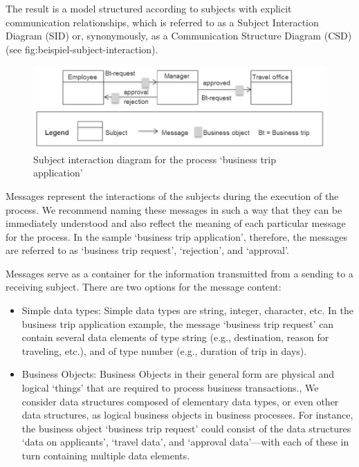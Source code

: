 The result is a model structured according to subjects with explicit communication relationships, which is referred to as a Subject Interaction Diagram (SID) or, synonymously, as a Communication Structure Diagram (CSD) (see \figurename{fig:beispiel-subject-interaction}).

\begin{figure}[ph]
	\centering
	\includegraphics[width=14cm]{20181026-Ontologie-Bilder/Grafiken-Ontologie/SUbject-Interaction/Beispiel-Subject-Interaction}
	\caption[Subject interaction diagram]{Subject interaction diagram for the process ‘business trip application’}
	\label{fig:beispiel-subject-interaction}
\end{figure}


Messages represent the interactions of the subjects during the execution of the process. We recommend naming these messages in such a way that they can be immediately understood and also reflect the meaning of each particular message for the process. In the sample ‘business trip application’, therefore, the messages are referred to as ‘business trip request’, ‘rejection’, and ‘approval’.

Messages serve as a container for the information transmitted from a sending to a receiving subject. There are two options for the message content:

\begin{itemize}
	\item 	Simple data types: Simple data types are string, integer, character, etc. In the business trip application example, the message ‘business trip request’ can contain several data elements of type string (e.g., destination, reason for traveling, etc.), and of type number (e.g., duration of trip in days).
	\item Business Objects: Business Objects in their general form are physical and logical ‘things’ that are required to process business transactions., We consider data structures composed of elementary data types, or even other data structures, as logical business objects in business processes. For instance, the business object ‘business trip request’ could consist of the data structures ‘data on applicants’, ‘travel data’, and ‘approval data’—with each of these in turn containing multiple data elements.
\end{itemize}



